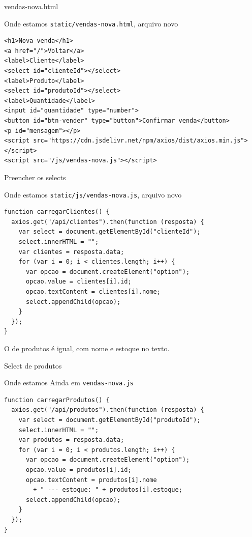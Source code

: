 \documentclass[aspectratio=169,11pt]{beamer}
\newcommand{\onde}[1]{%
  \begin{block}{Onde estamos}
    #1
  \end{block}
}
\begin{document}
\begin{frame}[fragile]{vendas-nova.html}
  \onde{\texttt{static/vendas-nova.html}, arquivo novo}

\begin{lstlisting}[basicstyle=\ttfamily\scriptsize]
<h1>Nova venda</h1>
<a href="/">Voltar</a>
<label>Cliente</label>
<select id="clienteId"></select>
<label>Produto</label>
<select id="produtoId"></select>
<label>Quantidade</label>
<input id="quantidade" type="number">
<button id="btn-vender" type="button">Confirmar venda</button>
<p id="mensagem"></p>
<script src="https://cdn.jsdelivr.net/npm/axios/dist/axios.min.js"></script>
<script src="/js/vendas-nova.js"></script>
\end{lstlisting}
\end{frame}

\begin{frame}[fragile]{Preencher os selects}
  \onde{\texttt{static/js/vendas-nova.js}, arquivo novo}

\begin{lstlisting}[basicstyle=\ttfamily\footnotesize]
function carregarClientes() {
  axios.get("/api/clientes").then(function (resposta) {
    var select = document.getElementById("clienteId");
    select.innerHTML = "";
    var clientes = resposta.data;
    for (var i = 0; i < clientes.length; i++) {
      var opcao = document.createElement("option");
      opcao.value = clientes[i].id;
      opcao.textContent = clientes[i].nome;
      select.appendChild(opcao);
    }
  });
}
\end{lstlisting}

  O de produtos é igual, com nome e estoque no texto.
\end{frame}

\begin{frame}[fragile]{Select de produtos}
  \onde{Ainda em \texttt{vendas-nova.js}}

\begin{lstlisting}[basicstyle=\ttfamily\footnotesize]
function carregarProdutos() {
  axios.get("/api/produtos").then(function (resposta) {
    var select = document.getElementById("produtoId");
    select.innerHTML = "";
    var produtos = resposta.data;
    for (var i = 0; i < produtos.length; i++) {
      var opcao = document.createElement("option");
      opcao.value = produtos[i].id;
      opcao.textContent = produtos[i].nome
        + " --- estoque: " + produtos[i].estoque;
      select.appendChild(opcao);
    }
  });
}
\end{lstlisting}
\end{frame}
\end{document}
